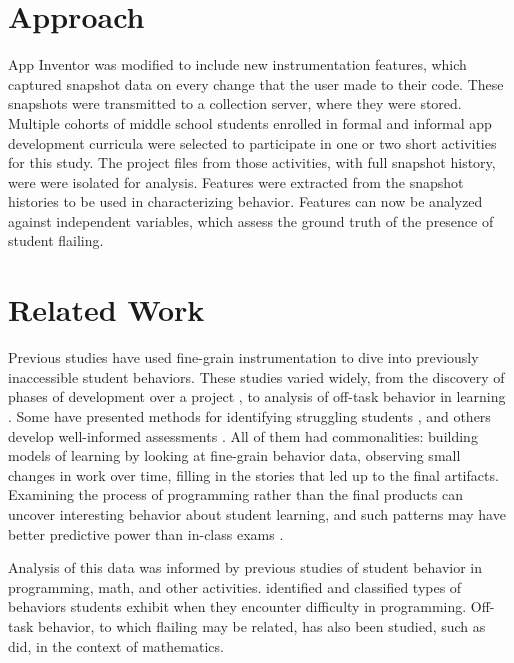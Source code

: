 

\section{Approach}
App Inventor was modified to include new instrumentation features, which captured snapshot data on every change that the user made to their code. These snapshots were transmitted to a collection server, where they were stored. Multiple cohorts of middle school students enrolled in formal and informal app development curricula were selected to participate in one or two short activities for this study. The project files from those activities, with full snapshot history, were were isolated for analysis. Features were extracted from the snapshot histories to be used in characterizing behavior. Features can now be analyzed against independent variables, which assess the ground truth of the presence of student flailing.

\section{Related Work} %
Previous studies have used fine-grain instrumentation to dive into previously inaccessible student behaviors. These studies varied widely, from the discovery of phases of development over a project \citep{berland-2013, martin2013nanogenetic}, to analysis of off-task behavior in learning \citep{baker2004off}. Some have presented methods for identifying struggling students \cite{piech-2012}, and others develop well-informed assessments \citep{werner2012fairy}. All of them had commonalities: building models of learning by looking at fine-grain behavior data, observing small changes in work over time, filling in the stories that led up to the final artifacts. Examining the process of programming rather than the final products can uncover interesting behavior about student learning, and such patterns may have better predictive power than in-class exams \citep{blikstein2014}.

Analysis of this data was informed by previous studies of student behavior in programming, math, and other activities. \cite{perkins-1986} identified and classified types of behaviors students exhibit when they encounter difficulty in programming. Off-task behavior, to which flailing may be related, has also been studied, such as \cite{baker2004off} did, in the context of mathematics. 

